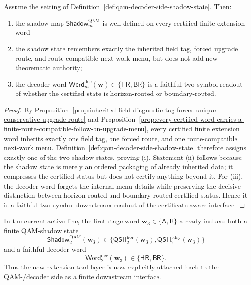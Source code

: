 \begin{proposition}
\label{prop:qam-decoder-side-shadow-is-a-faithful-finite-downstream-image-of-the-certificate-aware-interface}
Assume the setting of Definition~\ref{def:qam-decoder-side-shadow-state}. Then:
\begin{enumerate}[label=(\roman*)]
  \item the shadow map \(\mathsf{Shadow}^{\mathrm{QAM}}_{m}\) is well-defined on every certified finite extension word;
  \item the shadow state remembers exactly the inherited field tag, forced upgrade route, and route-compatible next-work menu, but does not add new theorematic authority;
  \item the decoder word \(\mathsf{Word}^{\mathrm{dec}}_{m}(\mathbf w)\in\{\mathsf{HR},\mathsf{BR}\}\) is a faithful two-symbol readout of whether the certified state is horizon-routed or boundary-routed.
\end{enumerate}
\end{proposition}

\begin{proof}
By Proposition~\ref{prop:inherited-field-diagnostic-tag-forces-unique-conservative-upgrade-route} and Proposition~\ref{prop:every-certified-word-carries-a-finite-route-compatible-follow-on-upgrade-menu}, every certified finite extension word inherits exactly one field tag, one forced route, and one route-compatible next-work menu. Definition~\ref{def:qam-decoder-side-shadow-state} therefore assigns exactly one of the two shadow states, proving (i). Statement (ii) follows because the shadow state is merely an ordered packaging of already inherited data; it compresses the certified status but does not certify anything beyond it. For (iii), the decoder word forgets the internal menu details while preserving the decisive distinction between horizon-routed and boundary-routed certified status. Hence it is a faithful two-symbol downstream readout of the certificate-aware interface.
\end{proof}

\begin{corollary}
\label{cor:present-sigma3-package-already-induces-a-first-explicit-qam-decoder-side-shadow}
In the current active line, the first-stage word \(\mathbf w_3\in\{\mathsf A,\mathsf B\}\) already induces both a finite QAM-shadow state
\[
  \mathsf{Shadow}^{\mathrm{QAM}}_{2}(\mathbf w_3)
  \in
  \{\mathsf{QSH}^{\mathrm{hor}}_{2}(\mathbf w_3),\mathsf{QSH}^{\mathrm{bdry}}_{2}(\mathbf w_3)\}
\]
and a faithful decoder word
\[
  \mathsf{Word}^{\mathrm{dec}}_{2}(\mathbf w_3)
  \in
  \{\mathsf{HR},\mathsf{BR}\}.
\]
Thus the new extension tool layer is now explicitly attached back to the QAM-/decoder side as a finite downstream interface.
\end{corollary}

